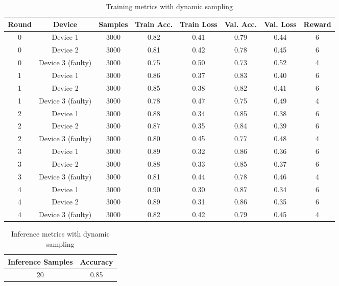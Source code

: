 \begin{table}[h!]
    \centering
    \caption{Training metrics with dynamic sampling}
    \label{tab:dynamic_sampling}
    \begin{tabular}{c c c c c c c c}
        \toprule
        \textbf{Round} & \textbf{Device} & \textbf{Samples} & \textbf{Train Acc.} & \textbf{Train Loss} & \textbf{Val. Acc.} & \textbf{Val. Loss} & \textbf{Reward} \\
        \midrule
        0 & Device 1 & 3000 & 0.82 & 0.41 & 0.79 & 0.44 & 6 \\
        0 & Device 2 & 3000 & 0.81 & 0.42 & 0.78 & 0.45 & 6 \\
        0 & Device 3 (faulty) & 3000 & 0.75 & 0.50 & 0.73 & 0.52 & 4 \\
        1 & Device 1 & 3000 & 0.86 & 0.37 & 0.83 & 0.40 & 6 \\
        1 & Device 2 & 3000 & 0.85 & 0.38 & 0.82 & 0.41 & 6 \\
        1 & Device 3 (faulty) & 3000 & 0.78 & 0.47 & 0.75 & 0.49 & 4 \\
        2 & Device 1 & 3000 & 0.88 & 0.34 & 0.85 & 0.38 & 6 \\
        2 & Device 2 & 3000 & 0.87 & 0.35 & 0.84 & 0.39 & 6 \\
        2 & Device 3 (faulty) & 3000 & 0.80 & 0.45 & 0.77 & 0.48 & 4 \\
        3 & Device 1 & 3000 & 0.89 & 0.32 & 0.86 & 0.36 & 6 \\
        3 & Device 2 & 3000 & 0.88 & 0.33 & 0.85 & 0.37 & 6 \\
        3 & Device 3 (faulty) & 3000 & 0.81 & 0.44 & 0.78 & 0.46 & 4 \\
        4 & Device 1 & 3000 & 0.90 & 0.30 & 0.87 & 0.34 & 6 \\
        4 & Device 2 & 3000 & 0.89 & 0.31 & 0.86 & 0.35 & 6 \\
        4 & Device 3 (faulty) & 3000 & 0.82 & 0.42 & 0.79 & 0.45 & 4 \\
        \bottomrule
    \end{tabular}
\end{table}

\begin{table}[h!]
    \centering
    \caption{Inference metrics with dynamic sampling}
    \label{tab:dynamic_inference}
    \begin{tabular}{c c}
        \toprule
        \textbf{Inference Samples} & \textbf{Accuracy} \\
        \midrule
        20 & 0.85 \\
        \bottomrule
    \end{tabular}
\end{table}

